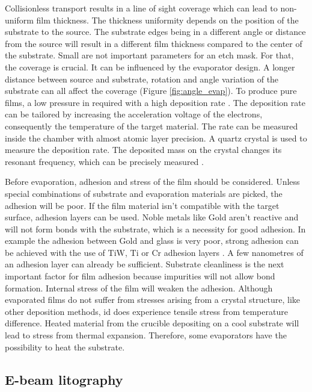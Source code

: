 \documentclass[draft]{jyflluk}
\begin{document}
Collisionless transport results in a line of sight coverage which can lead to non-uniform film thickness. The thickness uniformity depends on the position of the substrate to the source. The substrate edges being in a different angle or distance from the source will result in a different film thickness compared to the center of the substrate. Small are not important parameters for an etch mask. For that, the coverage is crucial. It can be influenced by the evaporator design. A longer distance between source and substrate, rotation and angle variation of the substrate can all affect the coverage (Figure \ref{fig:angle_evap}).
To produce pure films, a low pressure in required with a high deposition rate \cite{ohring1992materials}. The deposition rate can be tailored by increasing the acceleration voltage of the electrons, consequently the temperature of the target material. The rate can be measured inside the chamber with almost atomic layer precision. A quartz crystal is used to measure the deposition rate. The deposited mass on the crystal changes its resonant frequency, which can be precisely measured \cite{franssila2010introduction}. 

Before evaporation, adhesion and stress of the film should be considered. Unless special combinations of substrate and evaporation materials are picked, the adhesion will be poor. If the film material isn’t compatible with the target surface, adhesion layers can be used. Noble metals like Gold aren’t reactive and will not form bonds with the substrate, which is a necessity for good adhesion. In example the adhesion between Gold and glass is very poor, strong adhesion can be achieved with the use of $\mathrm{TiW}$, $\mathrm{Ti}$ or $\mathrm{Cr}$ adhesion layers \cite{chen2013study}. A few nanometres of an adhesion layer can already be sufficient. Substrate cleanliness is the next important factor for film adhesion because impurities will not allow bond formation. Internal stress of the film will weaken the adhesion. Although evaporated films do not suffer from stresses arising from a crystal structure, like other deposition methods, id does experience tensile stress from temperature difference. Heated material from the crucible depositing on a cool substrate will lead to stress from thermal expansion. Therefore, some evaporators have the possibility to heat the substrate. \cite{franssila2010introduction}


\subsection{E-beam litography}
\label{sec:xx3}
\end{document}

